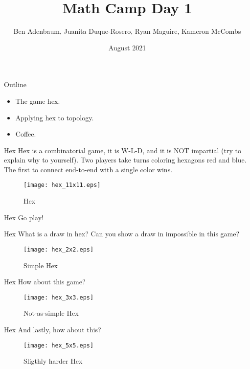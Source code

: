 \documentclass{beamer}
\title{Math Camp Day 1}
\author{Ben Adenbaum, Juanita Duque-Rosero, Ryan Maguire, Kameron McCombs}
\date{August 2021}
\begin{document}
    \maketitle
    \begin{frame}{Outline}
        \begin{itemize}
            \item The game hex.
            \item Applying hex to topology.
            \item Coffee.
        \end{itemize}
    \end{frame}
    \begin{frame}{Hex}
        Hex is a combinatorial game, it is W-L-D, and it is NOT
        impartial (try to explain why to yourself). Two players take turns coloring
        hexagons red and blue. The first to connect end-to-end with a single
        color wins.
        \begin{figure}
            \centering
            \texttt{[image: hex\_11x11.eps]}
            \caption{Hex}
            \label{fig:hex_11x11}
        \end{figure}
    \end{frame}
    \begin{frame}{Hex}
        Go play!
    \end{frame}
    \begin{frame}{Hex}
        What is a draw in hex? Can you show a draw in impossible in this game?
        \begin{figure}
            \centering
            \texttt{[image: hex\_2x2.eps]}
            \caption{Simple Hex}
            \label{fig:hex_2x2}
        \end{figure}
    \end{frame}
    \begin{frame}{Hex}
        How about this game?
        \begin{figure}
            \centering
            \texttt{[image: hex\_3x3.eps]}
            \caption{Not-as-simple Hex}
            \label{fig:hex_3x3}
        \end{figure}
    \end{frame}
    \begin{frame}{Hex}
        And lastly, how about this?
        \begin{figure}
            \centering
            \texttt{[image: hex\_5x5.eps]}
            \caption{Sligthly harder Hex}
            \label{fig:hex_5x5}
        \end{figure}
    \end{frame}
\end{document}
